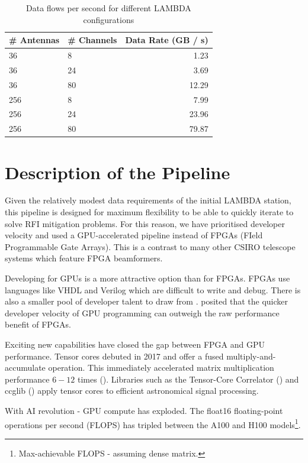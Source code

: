 \documentclass{pas}
\begin{document}
\begin{table}[b!]
 \caption{Data flows per second for different LAMBDA configurations}\label{data-flows-lambda}
 {\tablefont\begin{tabular}{@{\extracolsep{\fill}}llr}
   \toprule
    \# Antennas& \# Channels&
     Data Rate (GB / s) \\
     \hline
    36 &         8&  1.23\\
    36 &         24&  3.69\\
    36 &         80&  12.29\\
    256 &         8&  7.99\\
    256 &         24&  23.96\\
    256 &         80&  79.87
   \botrule
    \end{tabular}}
\end{table}



\section{Description of the Pipeline}

Given the relatively modest data requirements of the initial LAMBDA station,
this pipeline is designed for maximum flexibility to be able to quickly iterate to
solve RFI mitigation problems. 
For this reason, we have prioritised developer velocity and used a GPU-accelerated pipeline
instead of FPGAs (FIeld Programmable Gate Arrays). This is a contrast to many other 
CSIRO telescope systems which feature FPGA beamformers.

Developing for GPUs is a more attractive option than for FPGAs. FPGAs use
languages like VHDL and Verilog which are difficult to write and debug. There
is also a smaller pool of developer talent to draw from
\cite{vaithianathan_comparative_2023}. 
\cite{clark_accelerating_2013} posited that the quicker developer velocity of
GPU programming can outweigh the raw performance benefit of FPGAs.

Exciting new capabilities have closed the gap between FPGA and GPU performance.
Tensor cores debuted in 2017 and offer a fused multiply-and-accumulate
operation. This immediately accelerated matrix multiplication performance
$6-12$ times (\cite{markidis_nvidia_2018}). Libraries such as the Tensor-Core
Correlator (\cite{romein_tensor-core_2021}) and ccglib
(\cite{oostrum_tensor-core_2025}) apply tensor cores to efficient astronomical
signal processing.

With AI revolution - GPU compute has exploded.
The float16 floating-point operations per second (FLOPS) has tripled between 
the A100 and H100 models\footnote{Max-achievable FLOPS - assuming dense matrix.}.
\end{document}
